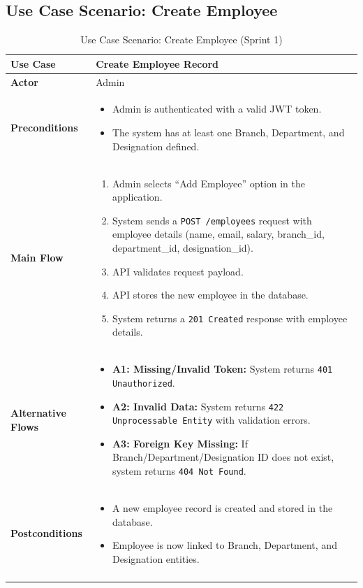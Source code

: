 \subsection{Use Case Scenario: Create Employee}
\begin{longtable}{|p{3cm}|p{11cm}|}
\hline
\textbf{Use Case} & Create Employee Record \\
\hline
\textbf{Actor} & Admin \\
\hline
\textbf{Preconditions} & 
\begin{itemize}
    \item Admin is authenticated with a valid JWT token.
    \item The system has at least one Branch, Department, and Designation defined.
\end{itemize} \\
\hline
\textbf{Main Flow} &
\begin{enumerate}
    \item Admin selects ``Add Employee'' option in the application.
    \item System sends a \texttt{POST /employees} request with employee details (name, email, salary, branch\_id, department\_id, designation\_id).
    \item API validates request payload.
    \item API stores the new employee in the database.
    \item System returns a \texttt{201 Created} response with employee details.
\end{enumerate} \\
\hline
\textbf{Alternative Flows} &
\begin{itemize}
    \item \textbf{A1: Missing/Invalid Token:} System returns \texttt{401 Unauthorized}.
    \item \textbf{A2: Invalid Data:} System returns \texttt{422 Unprocessable Entity} with validation errors.
    \item \textbf{A3: Foreign Key Missing:} If Branch/Department/Designation ID does not exist, system returns \texttt{404 Not Found}.
\end{itemize} \\
\hline
\textbf{Postconditions} & 
\begin{itemize}
    \item A new employee record is created and stored in the database.
    \item Employee is now linked to Branch, Department, and Designation entities.
\end{itemize} \\
\hline
\caption{Use Case Scenario: Create Employee (Sprint 1)}
\label{tab:usecase_create_employee}
\end{longtable}

